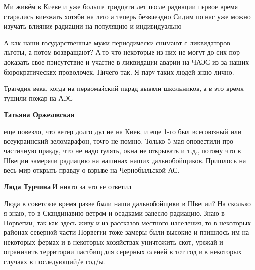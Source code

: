 
 
 
 
 
\zzSecCmt

\begin{itemize} %

Ми живём в Киеве и уже больше тридцати лет после радиации первое время старались виезжать хотяби на лето а теперь безвиездно
Сидим по нас уже можно изучать влияние радиации на популяцию и индивидуально

А как наши государственные мужи периодически снимают с ликвидаторов льготы, а потом возвращают?
А то что некоторые из них не могут до сих пор доказать свое присутствие и участие в ликвидации аварии на ЧАЭС из-за наших бюрократических проволочек.
Ничего так.
Я пару таких людей знаю лично.

Трагедия века, когда на первомайский парад вывели школьников, а в это время тушили пожар на АЭС

\begin{itemize} %
\textbf{Татьяна Оржеховская} 

еще повезло, что ветер долго дул не на Киев, и еще 1-го был всесоюзный или
всеукраинский веломарафон, точго не помню. Только 5 мая оповестили про
частичную правду, что не надо гулять, окна не открывать и т.д., потому что в
Швеции замеряли радиацию на машинах наших дальнобойщиков. Пришлось на весь мир
открыть правду о взрыве на Чернобыльской АС.

\begin{itemize} %
\textbf{Люда Турчина} И никто за это не ответил


Люда в советское время разве были наши дальнобойщики в Швеции? На сколько я
знаю, то в Скандинавию ветром и осадками занесло радиацию. Знаю в Норвегии, так
как здесь живу и из рассказов местного населения, то в некоторых районах
северной части Норвегии тоже замеры были высокие и пришлось им на некоторых
фермах и в некоторых хозяйствах уничтожить скот, урожай и ограничить территории
пастбищ для серерных оленей в тот год и в некоторых случаях в последующий/е
год/ы.


\end{itemize}
\end{itemize}
\end{itemize}
